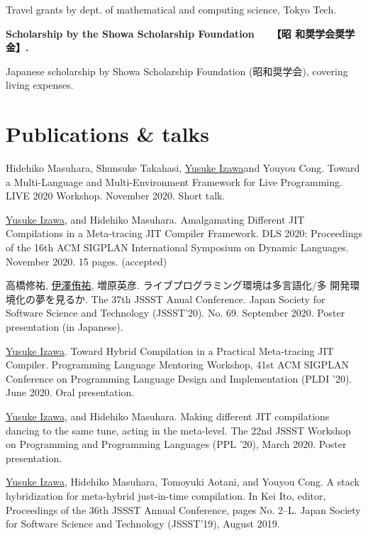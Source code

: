 \documentclass[11pt]{article} %
\newcommand{\YusukeIzawa}{\underline{Yusuke Izawa}}
\newcommand{\伊澤侑祐}{\underline{伊澤侑祐}}
\newcommand{\jit}{\textsc{JIT} }
\begin{document}
Travel grants by dept. of mathematical and computing science, Tokyo Tech.

\medskip


 \textbf{Scholarship by the Showa Scholarship Foundation~~~【昭
  和奨学会奨学金】.}

Japanese scholarship by Showa Scholarship Foundation (昭和奨学会), covering
living expenses.

\medskip


\section*{Publications \& talks}

 Hidehiko Masuhara, Shunsuke Takahasi, \YusukeIzawa and Youyou
Cong. Toward a Multi-Language and Multi-Environment Framework for Live Programming.
LIVE 2020 Workshop. November 2020. Short talk.

 \YusukeIzawa, and Hidehiko Masuhara. Amalgamating Different \jit
Compilations in a Meta-tracing \jit Compiler Framework. DLS 2020: Proceedings of
the 16th ACM SIGPLAN International Symposium on Dynamic Languages. November
2020. 15 pages. (accepted)
\medskip

 高橋修祐, \伊澤侑祐, 増原英彦. ライブプログラミング環境は多言語化/多
開発環境化の夢を見るか. The 37th JSSST Anual Conference. Japan Society for
Software Science and Technology (JSSST'20). No. 69. September 2020. Poster
presentation (in Japanese).
\medskip

 \YusukeIzawa. Toward Hybrid Compilation in a Practical Meta-tracing
\jit Compiler. Programming Language Mentoring Workshop, 41st ACM SIGPLAN
Conference on Programming Language Design and Implementation (PLDI '20). June
2020. Oral presentation.
\medskip

 \YusukeIzawa, and Hidehiko Masuhara. Making different \jit
compilations dancing to the same tune, acting in the meta-level. The 22nd JSSST
Workshop on Programming and Programming Languages (PPL '20), March 2020. Poster
presentation.
\medskip

 \YusukeIzawa, Hidehiko Masuhara, Tomoyuki Aotani, and Youyou
Cong. A stack hybridization for meta-hybrid just-in-time compilation. In Kei
Ito, editor, Proceedings of the 36th JSSST Annual Conference, pages
No. 2–L. Japan Society for Software Science and Technology (JSSST'19), August
2019.
\medskip
\end{document}
